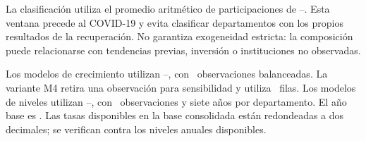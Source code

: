 La clasificación utiliza el promedio aritmético de participaciones de \PreStart--\PreEnd. Esta ventana precede al COVID-19 y evita clasificar departamentos con los propios resultados de la recuperación. No garantiza exogeneidad estricta: la composición puede relacionarse con tendencias previas, inversión o instituciones no observadas.

Los modelos de crecimiento utilizan \RateStart--\RateEnd, con \RatesObs\ observaciones balanceadas. La variante M4 retira una observación para sensibilidad y utiliza \NFour\ filas. Los modelos de niveles utilizan \LevelStart--\LevelEnd, con \LevelsObs\ observaciones y siete años por departamento. El año base es \BaseYear. Las tasas disponibles en la base consolidada están redondeadas a dos decimales; se verifican contra los niveles anuales disponibles.
